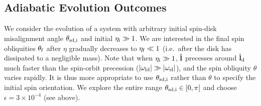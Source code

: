 \subsection{Adiabatic Evolution Outcomes}\label{ss:ad_ensemble}

We consider the evolution of a system with arbitrary initial spin-disk
misalignment angle $\theta_{\rm sd, i}$ and initial $\eta_{\rm i} \gg 1$. We are
interested in the final spin obliquities $\theta_{\rm f}$ after $\eta$ gradually
decreases to $\eta_{\rm f} \ll 1$ (i.e.\ after the disk has dissipated to a
negligible mass). Note that when $\eta_{\rm i} \gg 1$, $\hat{\boldsymbol{\mathbf{l}}}$ precesses
around $\hat{\boldsymbol{\mathbf{l}}}_{\rm d}$ much faster than the spin-orbit precession
($\left|\omega_{\rm ld}\right| \gg \left|\omega_{\rm sl}\right|$), and the spin obliquity
$\theta$ varies rapidly. It is thus more appropriate to use $\theta_{\rm sd, i}$
rather than $\theta$ to specify the initial spin orientation. We explore the
entire range $\theta_{\rm sd, i} \in [0, \pi]$ and choose $\epsilon = 3 \times
10^{-4}$ (see above).

